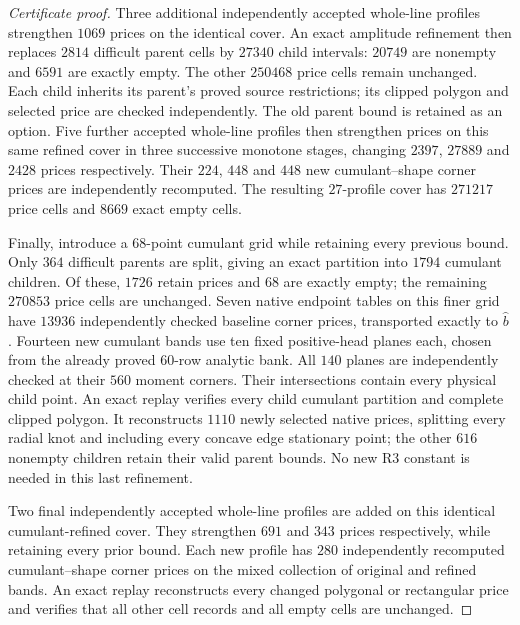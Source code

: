 \begin{proof}[Certificate proof]
Three additional independently accepted whole-line profiles strengthen
$1069$ prices on the identical cover. An exact amplitude refinement
then replaces $2814$ difficult parent cells by $27340$ child intervals:
$20749$ are nonempty and $6591$ are exactly empty. The other $250468$
price cells remain unchanged. Each child inherits its parent's proved
source restrictions; its clipped polygon and selected price are checked
independently. The old parent bound is retained as an option. Five
further accepted whole-line profiles then strengthen prices on this
same refined cover in three successive monotone stages, changing
$2397$, $27889$ and $2428$ prices respectively. Their $224$, $448$ and
$448$ new cumulant--shape corner prices are independently recomputed.
The resulting $27$-profile cover has $271217$ price cells and $8669$
exact empty cells.

Finally, introduce a $68$-point cumulant grid while retaining every
previous bound. Only $364$ difficult parents are split, giving an exact
partition into $1794$ cumulant children. Of these, $1726$ retain prices
and $68$ are exactly empty; the remaining $270853$ price cells are
unchanged. Seven native endpoint tables on this finer grid have $13936$
independently checked baseline corner prices, transported exactly to
$\widehat b$. Fourteen new cumulant bands use ten fixed positive-head
planes each, chosen from the already proved $60$-row analytic bank.
All $140$ planes are independently checked at their $560$ moment
corners. Their intersections contain every physical child point.
An exact replay verifies every child cumulant partition and complete
clipped polygon. It reconstructs $1110$ newly selected native prices,
splitting every radial knot and including every concave edge stationary
point; the other $616$ nonempty children retain their valid parent bounds.
No new R3 constant is needed in this last refinement.

Two final independently accepted whole-line profiles are added on
this identical cumulant-refined cover. They strengthen $691$ and $343$
prices respectively, while retaining every prior bound. Each new profile
has $280$ independently recomputed cumulant--shape corner prices on
the mixed collection of original and refined bands. An exact replay
reconstructs every changed polygonal or rectangular price and verifies
that all other cell records and all empty cells are unchanged.


\end{proof}
